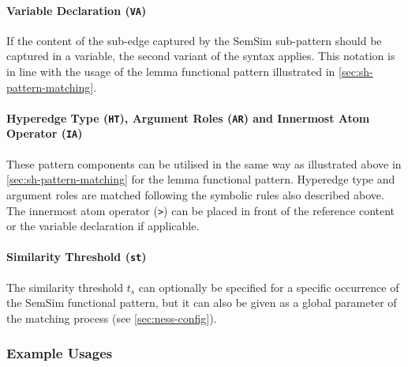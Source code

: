 \documentclass[11pt]{scrreprt}
\begin{document}
\paragraph{Variable Declaration (\texttt{VA})} 
If the content of the sub-edge captured by the SemSim sub-pattern should be captured in a variable, the second variant of the syntax applies. This notation is in line with the usage of the lemma functional pattern illustrated in \cref{sec:sh-pattern-matching}.


\paragraph{Hyperedge Type (\texttt{HT}),  Argument Roles (\texttt{AR}) and Innermost Atom Operator (\texttt{IA})} These pattern components can be utilised in the same way as illustrated above in \cref{sec:sh-pattern-matching} for the lemma functional pattern.
Hyperedge type and argument roles are matched following the symbolic rules also described above. The innermost atom operator (\texttt{>}) can be placed in front of the reference content or the variable declaration if applicable.


\paragraph{Similarity Threshold (\texttt{\gls{st}})}
The similarity threshold \(t_s\) can optionally be specified for a specific occurrence of the SemSim functional pattern, but it can also be given as a global parameter of the matching process (see \cref{sec:ness-config}). 

\subsubsection{Example Usages}
\end{document}
